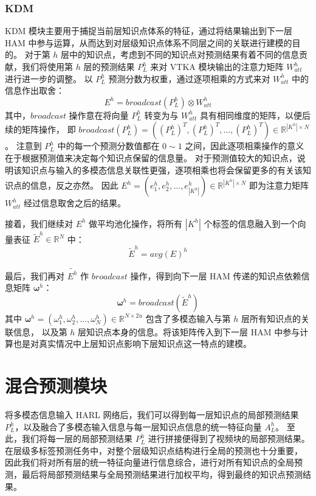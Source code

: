     \subsubsection{KDM}
    KDM 模块主要用于捕捉当前层知识点体系的特征，通过将结果输出到下一层 HAM 中参与运算，从而达到对层级知识点体系不同层之间的关联进行建模的目的。
    对于第 $h$ 层中的知识点，考虑到不同的知识点对预测结果有着不同的信息贡献，我们将使用第 $h$ 层的预测结果 $P_L^h$ 来对 VTKA 模块输出的注意力矩阵 $W_{att}^h$ 进行进一步的调整。
    以 $P_L^h$ 预测分数为权重，通过逐项相乘的方式来对 $W_{att}^h$ 中的信息作出取舍：
    \begin{equation}
        E^h = broadcast\left(P_L^h\right) \otimes W_{att}^h
    \end{equation}
    其中，$broadcast$ 操作意在将向量 $P_L^h$ 转变为与 $W_{att}^h$ 具有相同维度的矩阵，以便后续的矩阵操作，
    即 $broadcast\left(P_L^h\right) = \left(\left(P_L^h\right)^T, \left(P_L^h\right)^T, \dots, \left(P_L^h\right)^T\right) \in \mathbb{R}^{\left|K^h\right| \times N}$。
    注意到 $P_L^h$ 中的每一个预测分数值都在 $0 \sim 1$ 之间，因此逐项相乘操作的意义在于根据预测值来决定每个知识点保留的信息量。
    对于预测值较大的知识点，说明该知识点与输入的多模态信息关联性更强，逐项相乘也将会保留更多的有关该知识点的信息，反之亦然。
    因此 $E^h = (e_1^h, e_2^h, \dots, e_{\left|K^h\right|}^h) \in \mathbb{R}^{\left|K^h\right| \times N}$ 即为注意力矩阵 $W_{att}^h$ 经过信息取舍之后的结果。

    接着，我们继续对 $E^h$ 做平均池化操作，将所有 $\left|K^h\right|$ 个标签的信息融入到一个向量表征 $\tilde{E}^h \in \mathbb{R}^{N}$ 中：
    \begin{equation}
        \tilde{E}^h = avg\left(E\right)^h
    \end{equation}

    最后，我们再对 $\tilde{E^h}$ 作 $broadcast$ 操作，得到向下一层 HAM 传递的知识点依赖信息矩阵 $\boldsymbol{\omega}^h$：
    \begin{equation}
        \boldsymbol{\omega}^h = broadcast\left(\tilde{E}^h\right)
    \end{equation}
    其中 $\boldsymbol{\omega}^h = (\omega_1^h, \omega_2^h, \dots, \omega_N^h) \in \mathbb{R}^{N \times 2u}$ 包含了多模态输入与第 $h$ 层所有知识点的关联信息，
    以及第 $h$ 层知识点本身的信息。将该矩阵传入到下一层 HAM 中参与计算也是对真实情况中上层知识点影响下层知识点这一特点的建模。


\section{混合预测模块}
    将多模态信息输入 HARL 网络后，我们可以得到每一层知识点的局部预测结果 $P_L^h$，以及融合了多模态输入信息与每一层知识点信息的统一特征向量 $A_L^h$。
    至此，我们将每一层的局部预测结果 $P_L^h$ 进行拼接便得到了视频块的局部预测结果。
    在层级多标签预测任务中，对整个层级知识点结构进行全局的预测也十分重要，
    因此我们将对所有层的统一特征向量进行信息综合，进行对所有知识点的全局预测，最后将局部预测结果与全局预测结果进行加权平均，得到最终的知识点预测结果。

